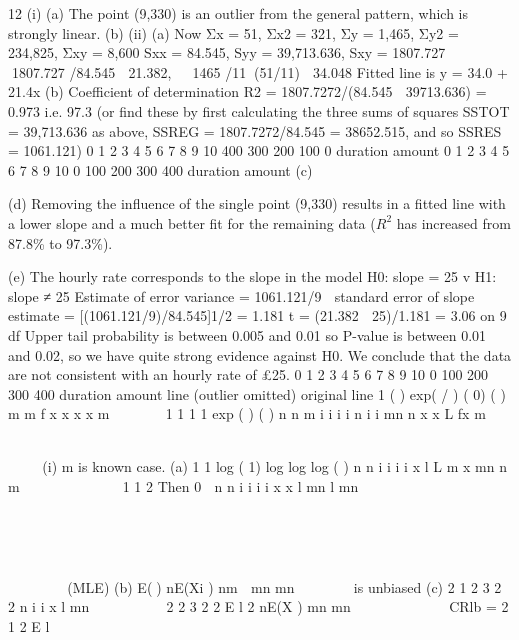 \documentclass[a4paper,12pt]{article}
\begin{document}
\begin{enumerate}
\begin{enumerate}
[Total 16]
\end{enumerate}
\newpage
12 (i) (a)
The point (9,330) is an outlier from the general pattern, which is
strongly linear.
(b)
(ii) (a) Now Σx = 51, Σx2 = 321, Σy = 1,465, Σy2 = 234,825, Σxy = 8,600
Sxx = 84.545, Syy = 39,713.636, Sxy = 1807.727
  1807.727 /84.545  21.382,  1465 /11\beta(51/11)  34.048
Fitted line is y = 34.0 + 21.4x
(b) Coefficient of determination R2 = 1807.7272/(84.545  39713.636)
= 0.973 i.e. 97.3%
(or find these by first calculating the three sums of squares SSTOT
= 39,713.636 as above, SSREG = 1807.7272/84.545 = 38652.515, and
so SSRES = 1061.121)
0 1 2 3 4 5 6 7 8 9 10
400
300
200
100
0
duration
amount
0 1 2 3 4 5 6 7 8 9 10
0
100
200
300
400
duration
amount
(c)

(d) Removing the influence of the single point (9,330) results in a fitted line with a lower slope and a much better fit for the remaining data ($R^2$ has increased from 87.8\% to 97.3\%).


(e) The hourly rate corresponds to the slope in the model
H0: slope = 25 v H1: slope ≠ 25
Estimate of error variance = 1061.121/9
 standard error of slope estimate = [(1061.121/9)/84.545]1/2 = 1.181
t = (21.382  25)/1.181 = 	3.06 on 9 df
Upper tail probability is between 0.005 and 0.01 so P-value is between
0.01 and 0.02, so we have quite strong evidence against H0. We
conclude that the data are not consistent with an hourly rate of £25.
0 1 2 3 4 5 6 7 8 9 10
0
100
200
300
400
duration
amount
line (outlier omitted)
original line
1 ( ) exp( / ) ( 0)
( )
m
m
f x x x x
m
  
 \beta
 
1 1
1
1
exp
( )
( )
n n m i i
i i n
i i mn n
x x
L fx
m
 


 \beta 
 \Gamma
  	 
 

 


(i) m is known case.
(a) 1
1
log ( 1) log log log ( )
n
n i
i
i
i
x
l L m x mn n m 

      \beta



1 1
2
Then 0 
n n
i i
i i
x x
l mn l
mn
   

  
 


   
 
(MLE)
(b) E() nE(Xi ) nm 
mn mn

    is unbiased
(c)
2
1
2 3 2 2
n
i
i
x
l mn  
  \beta
  

2
2 3 2 2
E l 2 nE(X ) mn mn
  
  \beta  \Gamma \beta  
 	  	 	 	
 CRlb =
2 1
2
E l
    \beta
\Gamma 		 


\end{enumerate}
\end{document}
